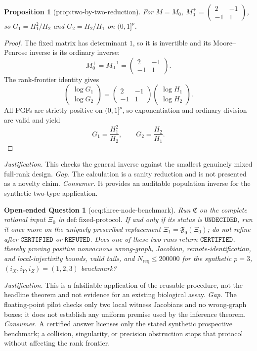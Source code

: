 \documentclass{article}
\newtheorem{proposition}{Proposition}
\newtheorem{openendedquestion}{Open-ended Question}
\begin{document}
\begin{proposition}[prop:two-by-two-reduction]\label{prop:two-by-two-reduction}
For \(M=M_0\), \(M_0^{+}=\begin{pmatrix}2&-1\\-1&1\end{pmatrix}\), so \(G_1=H_1^2/H_2\) and \(G_2=H_2/H_1\) on \((0,1]^p\).
\end{proposition}
\begin{proof}
The fixed matrix has determinant \(1\), so it is invertible and its Moore--Penrose inverse is its ordinary inverse:
\[
M_0^+=M_0^{-1}
=\begin{pmatrix}2&-1\\-1&1\end{pmatrix}.
\]
The rank-frontier identity gives
\[
\begin{pmatrix}\log G_1\\ \log G_2\end{pmatrix}
=\begin{pmatrix}2&-1\\-1&1\end{pmatrix}
\begin{pmatrix}\log H_1\\ \log H_2\end{pmatrix}.
\]
All PGFs are strictly positive on \((0,1]^p\), so exponentiation and ordinary division are valid and yield
\[
G_1=\frac{H_1^2}{H_2},\qquad G_2=\frac{H_2}{H_1}.
\]
\end{proof}
\par\smallskip\noindent \textit{Justification.} This checks the general inverse against the smallest genuinely mixed full-rank design. \textit{Gap.} The calculation is a sanity reduction and is not presented as a novelty claim. \textit{Consumer.} It provides an auditable population inverse for the synthetic two-type application.

\begin{openendedquestion}[oeq:three-node-benchmark]\label{oeq:three-node-benchmark}
Run \(\mathfrak C\) on the complete rational input \(\Xi_0\) in \(\mathrm{def{:}fixed\text{-}protocol}\). If and only if its status is \(\mathtt{UNDECIDED}\), run it once more on the uniquely prescribed replacement \(\Xi_1=\mathfrak F_0(\Xi_0)\); do not refine after \(\mathtt{CERTIFIED}\) or \(\mathtt{REFUTED}\). Does one of these two runs return \(\mathtt{CERTIFIED}\), thereby proving positive nonvacuous wrong-graph, Jacobian, remote-identification, and local-injectivity bounds, valid tails, and \(N_{\mathrm{req}}\leq200000\) for the synthetic \(p=3\), \((i_X,i_Y,i_Z)=(1,2,3)\) benchmark?
\end{openendedquestion}
\par\smallskip\noindent \textit{Justification.} This is a falsifiable application of the reusable procedure, not the headline theorem and not evidence for an existing biological assay. \textit{Gap.} The floating-point pilot checks only two local witness Jacobians and no wrong-graph boxes; it does not establish any uniform premise used by the inference theorem. \textit{Consumer.} A certified answer licenses only the stated synthetic prospective benchmark; a collision, singularity, or precision obstruction stops that protocol without affecting the rank frontier.
\end{document}
